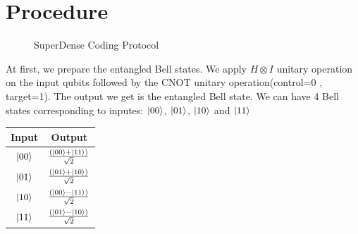 \documentclass{article}
\begin{document}
\section{Procedure}
\begin{figure}[H]
\centering 
\noindent{}%
\caption{SuperDense Coding Protocol}
\end{figure}
At first, we prepare the entangled Bell states. We apply $H \otimes I$ unitary operation on the input qubits followed by the CNOT unitary operation(control=0 , target=1). The output we get is the entangled Bell state. We can have 4 Bell states corresponding to inputes: $\ket{00}$, $\ket{01}$, $\ket{10}$ and $\ket{11}$ \\ \par
\begin{center}
\begin{tabular}{||c c ||}
\hline
Input & Output \\ [0.5ex]
\hline
\hline
$\ket{00}$ & $(\ket{00}+\ket{11}) \over \sqrt{2}$ \\
\hline
\hline
$\ket{01}$ & $(\ket{01}+\ket{10}) \over \sqrt{2}$ \\
\hline
\hline
$\ket{10}$ & $(\ket{00}-\ket{11}) \over \sqrt{2}$ \\
\hline
\hline
$\ket{11}$ & $(\ket{01}-\ket{10}) \over \sqrt{2}$ \\
\hline
\end{tabular}
\end{center}
\end{document}
